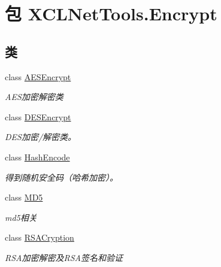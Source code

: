 \hypertarget{namespace_x_c_l_net_tools_1_1_encrypt}{\section{包 X\-C\-L\-Net\-Tools.\-Encrypt}
\label{namespace_x_c_l_net_tools_1_1_encrypt}
}
\subsection*{类}
\begin{DoxyCompactItemize}
\item 
class \hyperlink{class_x_c_l_net_tools_1_1_encrypt_1_1_a_e_s_encrypt}{A\-E\-S\-Encrypt}
\begin{DoxyCompactList}\small\item\em A\-E\-S加密解密类 \end{DoxyCompactList}\item 
class \hyperlink{class_x_c_l_net_tools_1_1_encrypt_1_1_d_e_s_encrypt}{D\-E\-S\-Encrypt}
\begin{DoxyCompactList}\small\item\em D\-E\-S加密/解密类。 \end{DoxyCompactList}\item 
class \hyperlink{class_x_c_l_net_tools_1_1_encrypt_1_1_hash_encode}{Hash\-Encode}
\begin{DoxyCompactList}\small\item\em 得到随机安全码（哈希加密）。 \end{DoxyCompactList}\item 
class \hyperlink{class_x_c_l_net_tools_1_1_encrypt_1_1_m_d5}{M\-D5}
\begin{DoxyCompactList}\small\item\em md5相关 \end{DoxyCompactList}\item 
class \hyperlink{class_x_c_l_net_tools_1_1_encrypt_1_1_r_s_a_cryption}{R\-S\-A\-Cryption}
\begin{DoxyCompactList}\small\item\em R\-S\-A加密解密及\-R\-S\-A签名和验证 \end{DoxyCompactList}\end{DoxyCompactItemize}
